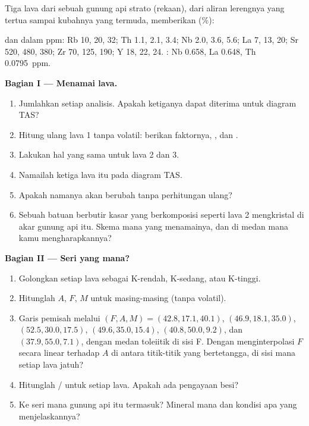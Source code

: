 \begin{problem}
\label{pb:b2:magmatic-series:1}
Tiga lava dari sebuah gunung api strato (rekaan), dari aliran lerengnya yang tertua sampai kubahnya
yang termuda, memberikan (\unit{\percent}):

\smallskip{}

\smallskip\noindent dan dalam ppm: Rb 10, 20, 32; Th 1.1, 2.1, 3.4; Nb 2.0, 3.6, 5.6;
La 7, 13, 20; Sr 520, 480, 380; Zr 70, 125, 190; Y 18, 22, 24. : Nb
0.658, La 0.648, Th \qty{0.0795}{ppm}.

\noindent\textbf{Bagian I --- Menamai lava.}
\begin{enumerate}
\item Jumlahkan setiap analisis. Apakah ketiganya dapat diterima untuk diagram TAS?
\item Hitung ulang lava 1 tanpa volatil: berikan faktornya, , dan
.
\item Lakukan hal yang sama untuk lava 2 dan 3.
\item Namailah ketiga lava itu pada diagram TAS.
\item Apakah namanya akan berubah tanpa perhitungan ulang?
\item Sebuah batuan berbutir kasar yang berkomposisi seperti lava 2 mengkristal di akar
gunung api itu. Skema mana yang menamainya, dan di medan mana kamu mengharapkannya?
\end{enumerate}

\noindent\textbf{Bagian II --- Seri yang mana?}
\begin{enumerate}[resume]
\item Golongkan setiap lava sebagai K-rendah, K-sedang, atau K-tinggi.
\item Hitunglah $A$, $F$, $M$ untuk masing-masing (tanpa volatil).
\item Garis pemisah melalui $(F, A, M) = (42.8, 17.1, 40.1)$, $(46.9, 18.1,
35.0)$, $(52.5, 30.0, 17.5)$, $(49.6, 35.0, 15.4)$, $(40.8, 50.0, 9.2)$, dan $(37.9,
55.0, 7.1)$, dengan medan toleiitik di sisi F. Dengan menginterpolasi $F$ secara linear terhadap
$A$ di antara titik-titik yang bertetangga, di sisi mana setiap lava jatuh?
\item Hitunglah / untuk setiap lava. Apakah ada pengayaan besi?
\item Ke seri mana gunung api itu termasuk? Mineral mana dan kondisi apa yang
menjelaskannya?
\end{enumerate}


\end{problem}
